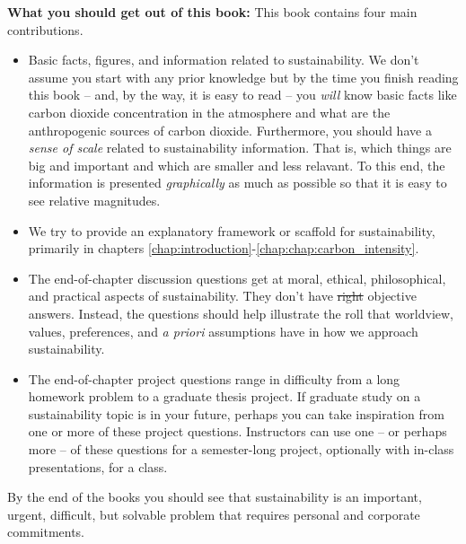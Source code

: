 {\textbf{What you should get out of this book:} This book contains four main 
contributions.
\begin{itemize}
\item Basic facts, figures, and information related to sustainability. We don't 
assume you start with any prior knowledge but by the time you finish reading this
book -- and, by the way, it is easy to read -- you \emph{will} know basic facts
like carbon dioxide concentration in the atmosphere and what are the anthropogenic
sources of carbon dioxide. Furthermore, you should have a \emph{sense of scale}
related to sustainability information. That is, which things are big and 
important and which are smaller and less relavant. To this end, the information
is presented \emph{graphically} as much as possible so that it is easy to see
relative magnitudes.
\item We try to provide an explanatory framework or scaffold for sustainability,
primarily in chapters \ref{chap:introduction}-\ref{chap:chap:carbon_intensity}.
\item The end-of-chapter discussion questions get at moral, ethical, philosophical,
and practical aspects of sustainability. They don't have \sout{right} objective 
answers. Instead, the questions should help illustrate the roll that worldview, 
values, preferences, and \emph{a priori} assumptions have in how we approach sustainability. 
\item The end-of-chapter project questions range in difficulty from a long
homework problem to a graduate thesis project. If graduate study on a sustainability
topic is in your future, perhaps you can take inspiration from one or more of 
these project questions. Instructors can use one -- or perhaps more -- of these 
questions for a semester-long project, optionally with in-class presentations, for a class.
\end{itemize}
By the end of the books you should see that sustainability is an important, 
urgent, difficult, but solvable problem that requires personal and corporate 
commitments. \\

}

